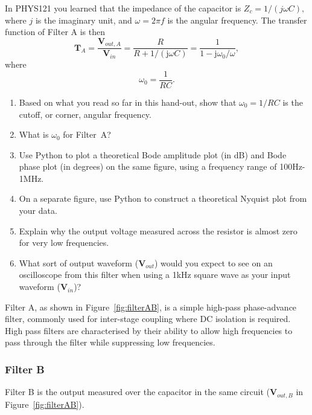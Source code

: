\documentclass{article}
\begin{document}
In PHYS121 you learned that the impedance of the capacitor is
$Z_c= 1/(j\omega C),$ where $j$ is the imaginary unit, and
$\omega = 2\pi f$ is the angular frequency. The transfer function of
Filter A is then
\begin{equation}
  \mathbf{T}_A=\frac{\mathbf{V}_{out, A}}{\mathbf{V}_{in}}=
  \frac{R}{R+1/(\mathrm{j}\omega C)}=\frac{1}{1-\mathrm{j}\omega_0/\omega},
\end{equation}
where
\begin{equation}
  \omega_0=\frac{1}{RC}.
\end{equation}
\begin{enumerate}[resume]
\item Based on what you read so far in this hand-out, show that
  $\omega_0 = 1/RC$ is the cutoff, or corner, angular
  frequency. %
\item What is $\omega_0$ for Filter~A?
\item Use Python to plot a theoretical Bode amplitude plot (in
  dB) and Bode phase plot (in degrees) on the same figure, using a
  frequency range of 100Hz-1MHz.
\item On a separate figure, use Python to
  construct a theoretical Nyquist plot from your data.
\item Explain why the output voltage measured
  across the resistor is almost zero for very low
  frequencies. 
\item What sort of output waveform ($\mathbf{V}_{out}$) would you
  expect to see on an oscilloscope from this filter when using a 1kHz
  square wave as your input waveform
  ($\mathbf{V}_{in}$)? %
\end{enumerate}

Filter A, as shown in Figure~\ref{fig:filterAB}, is a simple high-pass
phase-advance filter, commonly used for inter-stage coupling where DC
isolation is required.  High pass filters are characterised by their
ability to allow high frequencies to pass through the filter while
suppressing low frequencies.

\subsubsection*{Filter B}
Filter B is the output measured over the capacitor in the same
circuit ($\mathbf{V}_{out, B}$ in Figure~\ref{fig:filterAB}).
\end{document}
